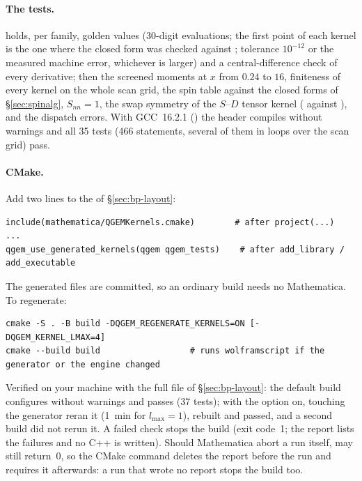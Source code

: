 \documentclass[11pt,a4paper]{article}
\numberwithin{equation}{section}
\theoremstyle{definition}
\theoremstyle{plain}
\theoremstyle{remark}
\numberwithin{algorithm}{section}
\begin{document}
\paragraph{The tests.}  holds, per family, golden values (30-digit evaluations; the first point of each kernel is the one where the closed form was checked against ; tolerance $10^{-12}$ or the measured machine error, whichever is larger) and a central-difference check of every derivative; then the screened moments at $x$ from $0.24$ to $16$, finiteness of every kernel on the whole scan grid, the spin table against the closed forms of \S\ref{sec:spinalg}, $S_{nn}=1$, the swap symmetry of the $S$--$D$ tensor kernel ( against ), and the dispatch errors. With GCC~16.2.1 () the header compiles without warnings and all 35 tests (466  statements, several of them in loops over the scan grid) pass.

\paragraph{CMake.} Add two lines to the  of \S\ref{sec:bp-layout}:
\begin{lstlisting}[style=cmake]
include(mathematica/QGEMKernels.cmake)        # after project(...)
...
qgem_use_generated_kernels(qgem qgem_tests)    # after add_library / add_executable
\end{lstlisting}
The generated files are committed, so an ordinary build needs no Mathematica. To regenerate:
\begin{lstlisting}[style=plain]
cmake -S . -B build -DQGEM_REGENERATE_KERNELS=ON [-DQGEM_KERNEL_LMAX=4]
cmake --build build                  # runs wolframscript if the generator or the engine changed
\end{lstlisting}
Verified on your machine with the full file of \S\ref{sec:bp-layout}: the default build configures without warnings and  passes (37 tests); with the option on, touching the generator reran it (1~min for $l_{\max}=1$), rebuilt and passed, and a second build did not rerun it. A failed check stops the build (exit code~1; the report lists the failures and no C++ is written). Should Mathematica abort a run itself,  may still return~0, so the CMake command deletes the report before the run and requires it afterwards: a run that wrote no report stops the build too.
\end{document}
